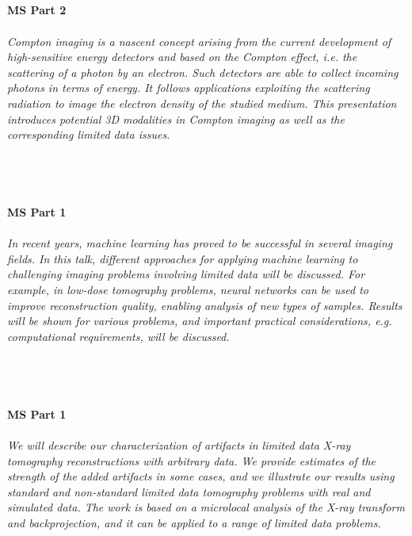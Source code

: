 \begin{multicols}{2}
\\ 
    \\
    \\\\
    \noindent\textbf{MS Part 2}\\
\\  
    \textit{Compton imaging is a nascent concept arising from the current development of high-sensitive energy detectors and based on the Compton effect, i.e. the scattering of a photon by an electron.  Such detectors are able to collect incoming photons in terms of energy. It follows applications exploiting the scattering radiation to image the electron density of the studied medium.  This presentation introduces potential 3D modalities in Compton imaging as well as the corresponding limited data issues.}\\
\\ 
    \\
    \\\\
    \noindent\textbf{MS Part 1}\\
\\  
    \textit{In recent years, machine learning has proved to be successful in several imaging fields. In this talk, different approaches for applying machine learning to challenging imaging problems involving limited data will be discussed. For example, in low-dose tomography problems, neural networks can be used to improve reconstruction quality, enabling analysis of new types of samples. Results will be shown for various problems, and important practical considerations, e.g. computational requirements, will be discussed.}\\
\\ 
    \\
    \\\\
    \noindent\textbf{MS Part 1}\\
\\  
    \textit{We will describe our characterization of artifacts in limited data X-ray tomography reconstructions with arbitrary data.  We provide estimates of the strength of the added artifacts in some cases, and we illustrate our results using standard and non-standard limited data tomography problems with real and simulated data. The work is based on a microlocal analysis of the X-ray transform and backprojection, and it can be applied to a range of  limited data problems. }\\

\end{multicols}
